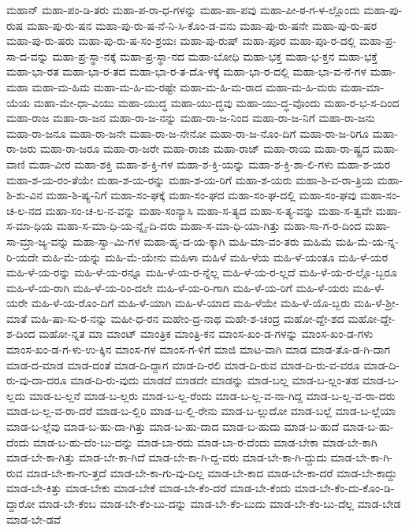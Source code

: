 {ಮಹಾನ್
ಮಹಾ-ಪಂ-ಡಿ-ತರು
ಮಹಾ-ಪ-ರಾ-ಧ-ಗಳನ್ನು
ಮಹಾ-ಪಾ-ಪವು
ಮಹಾ-ಪೀ-ಠ-ಗ-ಳ-ಲ್ಲೊಂದು
ಮಹಾ-ಪು-ರುಷ
ಮಹಾ-ಪು-ರು-ಷನ
ಮಹಾ-ಪು-ರು-ಷ-ನೆ-ನಿ-ಸಿ-ಕೊಂ-ಡ-ವನು
ಮಹಾ-ಪು-ರು-ಷನೇ
ಮಹಾ-ಪು-ರು-ಷರ
ಮಹಾ-ಪು-ರು-ಷರು
ಮಹಾ-ಪು-ರು-ಷ-ಸಂ-ಶ್ರಯಃ
ಮಹಾ-ಪು-ರುಷ್
ಮಹಾ-ಪೂರ
ಮಹಾ-ಪೂ-ರ-ದಲ್ಲಿ
ಮಹಾ-ಪ್ರ-ಸಾ-ದ-ವನ್ನು
ಮಹಾ-ಪ್ರ-ಸ್ಥಾ-ನಕ್ಕೆ
ಮಹಾ-ಪ್ರ-ಸ್ಥಾ-ನದ
ಮಹಾ-ಬೋಧಿ
ಮಹಾ-ಭಕ್ತ
ಮಹಾ-ಭ-ಕ್ತನ
ಮಹಾ-ಭಕ್ತೆ
ಮಹಾ-ಭಾ-ರತ
ಮಹಾ-ಭಾ-ರ-ತದ
ಮಹಾ-ಭಾ-ರ-ತ-ದೊ-ಳಕ್ಕೆ
ಮಹಾ-ಭಾ-ರ-ದಲ್ಲಿ
ಮಹಾ-ಭಾ-ವ-ನೆ-ಗಳ
ಮಹಾ-ಮಹಾ
ಮಹಾ-ಮ-ಹಿಮ
ಮಹಾ-ಮ-ಹಿ-ಮ-ರಷ್ಟೇ
ಮಹಾ-ಮ-ಹಿ-ಮ-ರಾದ
ಮಹಾ-ಮ-ಹಿ-ಮರು
ಮಹಾ-ಮಾ-ಯೆಯ
ಮಹಾ-ಮೇ-ಧಾ-ವಿಯು
ಮಹಾ-ಯುದ್ಧ
ಮಹಾ-ಯು-ದ್ಧವು
ಮಹಾ-ಯು-ದ್ಧ-ವೊಂದು
ಮಹಾ-ರ-ಭ-ಸ-ದಿಂದ
ಮಹಾ-ರಾಜ
ಮಹಾ-ರಾ-ಜನ
ಮಹಾ-ರಾ-ಜ-ನನ್ನು
ಮಹಾ-ರಾ-ಜ-ನಿಂದ
ಮಹಾ-ರಾ-ಜ-ನಿಗೆ
ಮಹಾ-ರಾ-ಜನು
ಮಹಾ-ರಾ-ಜನೂ
ಮಹಾ-ರಾ-ಜನೇ
ಮಹಾ-ರಾ-ಜ-ನೇನೋ
ಮಹಾ-ರಾ-ಜ-ನೊಂ-ದಿಗೆ
ಮಹಾ-ರಾ-ಜ-ರಿಗೂ
ಮಹಾ-ರಾ-ಜರು
ಮಹಾ-ರಾ-ಜರೂ
ಮಹಾ-ರಾ-ಜರೇ
ಮಹಾ-ರಾಜಾ
ಮಹಾ-ರಾಜ್
ಮಹಾ-ರಾಯ
ಮಹಾ-ರಾ-ಷ್ಟ್ರದ
ಮಹಾ-ವಾಣಿ
ಮಹಾ-ವೀರ
ಮಹಾ-ಶಕ್ತಿ
ಮಹಾ-ಶ-ಕ್ತಿ-ಗಳ
ಮಹಾ-ಶ-ಕ್ತಿ-ಯನ್ನು
ಮಹಾ-ಶ-ಕ್ತಿ-ಶಾ-ಲಿ-ಗಳು
ಮಹಾ-ಶ-ಯರ
ಮಹಾ-ಶ-ಯ-ರಂ-ತೆಯೇ
ಮಹಾ-ಶ-ಯ-ರನ್ನು
ಮಹಾ-ಶ-ಯ-ರಿಗೆ
ಮಹಾ-ಶ-ಯರು
ಮಹಾ-ಶಿ-ವ-ರಾ-ತ್ರಿಯ
ಮಹಾ-ಶಿ-ಶು-ವಿನ
ಮಹಾ-ಶಿ-ಷ್ಯ-ನಿಗೆ
ಮಹಾ-ಸಂ-ಘಕ್ಕೆ
ಮಹಾ-ಸಂ-ಘದ
ಮಹಾ-ಸಂ-ಘ-ದಲ್ಲಿ
ಮಹಾ-ಸಂ-ಘವು
ಮಹಾ-ಸಂ-ಚ-ಲ-ನದ
ಮಹಾ-ಸಂ-ಚ-ಲ-ನ-ವನ್ನು
ಮಹಾ-ಸಂನ್ಯಾಸಿ
ಮಹಾ-ಸ-ತ್ಯದ
ಮಹಾ-ಸ-ತ್ಯ-ವನ್ನು
ಮಹಾ-ಸ-ತ್ವವೇ
ಮಹಾ-ಸ-ಮಾ-ಧಿಯ
ಮಹಾ-ಸ-ಮಾ-ಧಿ-ಯ-ನ್ನೈ-ದಿ-ದರು
ಮಹಾ-ಸ-ಮಾ-ಧಿ-ಯಾ-ಗಿತ್ತು
ಮಹಾ-ಸಾ-ಗ-ರ-ದಿಂದ
ಮಹಾ-ಸಾ-ಮ್ರಾ-ಜ್ಯ-ವನ್ನು
ಮಹಾ-ಸ್ವಾ-ಮಿ-ಗಳ
ಮಹಾ-ಹೃ-ದ-ಯ-ಕ್ಕಾಗಿ
ಮಹಿ-ಮಾ-ವಂ-ತರು
ಮಹಿಮೆ
ಮಹಿ-ಮೆ-ಯ-ನ್ನ-ರಿ-ಯದೇ
ಮಹಿ-ಮೆ-ಯನ್ನು
ಮಹಿ-ಮೆ-ಯೇನು
ಮಹಿಳಾ
ಮಹಿಳೆ
ಮಹಿ-ಳೆಯ
ಮಹಿ-ಳೆ-ಯಂತೂ
ಮಹಿ-ಳೆ-ಯರ
ಮಹಿ-ಳೆ-ಯ-ರನ್ನು
ಮಹಿ-ಳೆ-ಯ-ರನ್ನೂ
ಮಹಿ-ಳೆ-ಯ-ರ-ನ್ನೆಲ್ಲ
ಮಹಿ-ಳೆ-ಯ-ರ-ಲ್ಲದೆ
ಮಹಿ-ಳೆ-ಯ-ರ-ಲ್ಲೊ-ಬ್ಬರೂ
ಮಹಿ-ಳೆ-ಯ-ರಾಗಿ
ಮಹಿ-ಳೆ-ಯ-ರಿಂ-ದಲೇ
ಮಹಿ-ಳೆ-ಯ-ರಿ-ಗಾಗಿ
ಮಹಿ-ಳೆ-ಯ-ರಿಗೆ
ಮಹಿ-ಳೆ-ಯರು
ಮಹಿ-ಳೆ-ಯರೇ
ಮಹಿ-ಳೆ-ಯ-ರೊಂ-ದಿಗೆ
ಮಹಿ-ಳೆ-ಯಾಗಿ
ಮಹಿ-ಳೆ-ಯಾದ
ಮಹಿ-ಳೆಯೇ
ಮಹಿ-ಳೆ-ಯೊ-ಬ್ಬರು
ಮಹಿ-ಳೆ-ಶ್ರೀ-ಮಾತೆ
ಮಹಿ-ಷಾ-ಸು-ರ-ನನ್ನು
ಮಹೀ-ಧ-ರನ
ಮಹೇಂ-ದ್ರ-ನಾಥ
ಮಹೇ-ಶ-ಚಂದ್ರ
ಮಹೋ-ದ್ದೇ-ಶದ
ಮಹೋ-ದ್ದೇ-ಶ-ದಿಂದ
ಮಹೋ-ನ್ನತ
ಮಾ
ಮಾಂಟ್
ಮಾಂತ್ರಿಕ
ಮಾಂತ್ರಿ-ಕನ
ಮಾಂಸ-ಖಂ-ಡ-ಗಳನ್ನು
ಮಾಂಸ-ಖಂ-ಡ-ಗಳು
ಮಾಂಸ-ಖಂ-ಡ-ಗ-ಳು-ಉ-ಕ್ಕಿನ
ಮಾಂಸ-ಗಳ
ಮಾಂಸ-ಗ-ಳಿಗೆ
ಮಾಜಿ
ಮಾಟ-ವಾಗಿ
ಮಾಡ
ಮಾಡ-ತೊ-ಡ-ಗಿ-ದಾಗ
ಮಾಡ-ದ-ಮಾಡ
ಮಾಡ-ದಂತೆ
ಮಾಡ-ದಿ-ದ್ದಾಗ
ಮಾಡ-ದಿ-ರಲಿ
ಮಾಡ-ದಿ-ರುವ
ಮಾಡ-ದಿ-ರು-ವ-ವರೂ
ಮಾಡ-ದಿ-ರು-ವು-ದಾ-ದರೂ
ಮಾಡ-ದಿ-ರು-ವುದು
ಮಾಡದೆ
ಮಾಡದೇ
ಮಾಡನ್ನು
ಮಾಡ-ಬಲ್ಲ
ಮಾಡ-ಬ-ಲ್ಲಂ-ತಹ
ಮಾಡ-ಬ-ಲ್ಲದು
ಮಾಡ-ಬ-ಲ್ಲನೆ
ಮಾಡ-ಬ-ಲ್ಲರು
ಮಾಡ-ಬ-ಲ್ಲ-ರೆಂದು
ಮಾಡ-ಬ-ಲ್ಲ-ವ-ನಾ-ಗಿದ್ದ
ಮಾಡ-ಬ-ಲ್ಲ-ವ-ರಾ-ದರು
ಮಾಡ-ಬ-ಲ್ಲ-ವ-ರಾ-ದರೆ
ಮಾಡ-ಬ-ಲ್ಲಿರಿ
ಮಾಡ-ಬ-ಲ್ಲಿ-ರೇನು
ಮಾಡ-ಬ-ಲ್ಲುದೋ
ಮಾಡ-ಬಲ್ಲೆ
ಮಾಡ-ಬ-ಲ್ಲೆಯಾ
ಮಾಡ-ಬ-ಲ್ಲೆವು
ಮಾಡ-ಬ-ಹು-ದಾ-ಗಿತ್ತು
ಮಾಡ-ಬ-ಹು-ದಾದ
ಮಾಡ-ಬ-ಹುದು
ಮಾಡ-ಬ-ಹುದೆ
ಮಾಡ-ಬ-ಹು-ದೆಂದು
ಮಾಡ-ಬ-ಹು-ದೆಂ-ಬು-ದನ್ನು
ಮಾಡ-ಬಾ-ರದು
ಮಾಡ-ಬಾ-ರ-ದೆಂದು
ಮಾಡ-ಬೇಕಾ
ಮಾಡ-ಬೇ-ಕಾಗಿ
ಮಾಡ-ಬೇ-ಕಾ-ಗಿತ್ತು
ಮಾಡ-ಬೇ-ಕಾ-ಗಿದೆ
ಮಾಡ-ಬೇ-ಕಾ-ಗಿ-ದ್ದ-ವರು
ಮಾಡ-ಬೇ-ಕಾ-ಗಿ-ದ್ದುದು
ಮಾಡ-ಬೇ-ಕಾ-ಗಿ-ರುವ
ಮಾಡ-ಬೇ-ಕಾ-ಗು-ತ್ತದೆ
ಮಾಡ-ಬೇ-ಕಾ-ಗು-ವು-ದಿಲ್ಲ
ಮಾಡ-ಬೇ-ಕಾದ
ಮಾಡ-ಬೇ-ಕಾ-ದರೆ
ಮಾಡ-ಬೇ-ಕಾದ್ದು
ಮಾಡ-ಬೇ-ಕಿತ್ತು
ಮಾಡ-ಬೇಕು
ಮಾಡ-ಬೇಕೆ
ಮಾಡ-ಬೇ-ಕೆಂ-ದರೆ
ಮಾಡ-ಬೇ-ಕೆಂದು
ಮಾಡ-ಬೇ-ಕೆಂ-ದು-ಕೊಂ-ಡಿ-ದ್ದಾರೋ
ಮಾಡ-ಬೇ-ಕೆಂಬ
ಮಾಡ-ಬೇ-ಕೆಂ-ಬು-ದನ್ನು
ಮಾಡ-ಬೇ-ಕೆಂ-ಬುದು
ಮಾಡ-ಬೇ-ಕೆಂ-ಬು-ದೆಲ್ಲ
ಮಾಡ-ಬೇಡ
ಮಾಡ-ಬೇ-ಡವೆ
}
